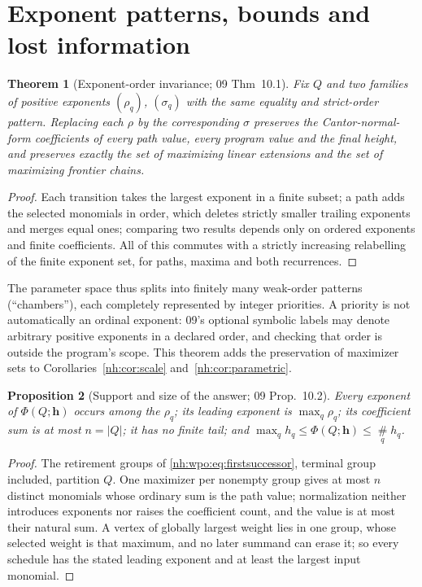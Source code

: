 \documentclass[11pt,a4paper]{article}
\newtheorem{theorem}{Theorem}[section]
\newtheorem{proposition}[theorem]{Proposition}
\theoremstyle{definition}
\theoremstyle{remark}
\newcommand{\bigns}{\mathop{\#}\limits}
\begin{document}
\section{Exponent patterns, bounds and lost information}\label{nh:wpo:sec:invariants}

\begin{theorem}[Exponent-order invariance; 09 Thm~10.1]\label{nh:wpo:thm:chambers}
Fix $Q$ and two families of positive exponents $(\rho_q)$, $(\sigma_q)$ with the
same equality and strict-order pattern. Replacing each $\rho$ by the corresponding
$\sigma$ preserves the Cantor-normal-form coefficients of every path value, every
program value and the final height, and preserves exactly the set of maximizing
linear extensions and the set of maximizing frontier chains.
\end{theorem}
\begin{proof}
Each transition takes the largest exponent in a finite subset; a path adds the
selected monomials in order, which deletes strictly smaller trailing exponents and
merges equal ones; comparing two results depends only on ordered exponents and
finite coefficients. All of this commutes with a strictly increasing relabelling
of the finite exponent set, for paths, maxima and both recurrences.
\end{proof}

The parameter space thus splits into finitely many weak-order patterns
(``chambers''), each completely represented by integer priorities. A priority is
not automatically an ordinal exponent: 09's optional symbolic labels may denote
arbitrary positive exponents in a declared order, and checking that order is
outside the program's scope. This theorem adds the preservation of maximizer sets
to Corollaries~\ref{nh:cor:scale} and~\ref{nh:cor:parametric}.

\begin{proposition}[Support and size of the answer; 09 Prop.~10.2]\label{nh:wpo:prop:budget}
Every exponent of $\Phi(Q;\boldsymbol h)$ occurs among the $\rho_q$; its leading
exponent is $\max_q\rho_q$; its coefficient sum is at most $n=|Q|$; it has no
finite tail; and $\max_qh_q\le\Phi(Q;\boldsymbol h)\le\bigns_qh_q$.
\end{proposition}
\begin{proof}
The retirement groups of \eqref{nh:wpo:eq:firstsuccessor}, terminal group
included, partition $Q$. One maximizer per nonempty group gives at most $n$
distinct monomials whose ordinary sum is the path value; normalization neither
introduces exponents nor raises the coefficient count, and the value is at most
their natural sum. A vertex of globally largest weight lies in one group, whose
selected weight is that maximum, and no later summand can erase it; so every
schedule has the stated leading exponent and at least the largest input monomial.
\end{proof}
\end{document}
